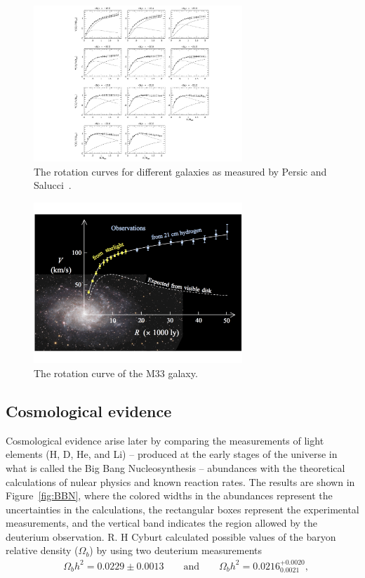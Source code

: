 \begin{figure}
 \centering
\includegraphics[width=0.7\textwidth]{IntroFigures/RotationCurve1.pdf}
 \caption{The rotation curves for different galaxies as measured by Persic and Salucci~\cite{PandS}.\label{fig:rotationcurve}}
\end{figure}
\begin{figure}
 \centering
\includegraphics[width=0.7\textwidth]{IntroFigures/M33_rotation_curve_HI.pdf}
\caption{The rotation curve of the M33 galaxy.\label{fig:M33}}
\end{figure}

\subsection{Cosmological evidence}
Cosmological evidence arise later by comparing the measurements of light
elements (H, D, He, and Li) -- produced at
the early stages of the universe in what is called the Big Bang
Nucleosynthesis -- abundances with
the theoretical calculations of nulear physics and known reaction
rates. The results are shown in Figure~\ref{fig:BBN}, where the colored
widths in the abundances represent the uncertainties in the calculations, the
rectangular boxes represent the experimental measurements, and the
vertical band indicates the region allowed by the deuterium
observation. R. H Cyburt calculated possible values of the baryon
relative density ($\Omega_{b}$) by using two deuterium measurements~\cite{BBN}
\begin{equation}
\label{eq:BBN}
\begin{aligned}
       &\Omega_{b}h^{2} = 0.0229\pm0.0013 
        \qquad \text{and}  \qquad  \Omega_{b}h^{2} = 0.0216^{+0.0020}_{0.0021},
       \end{aligned}
\end{equation}

